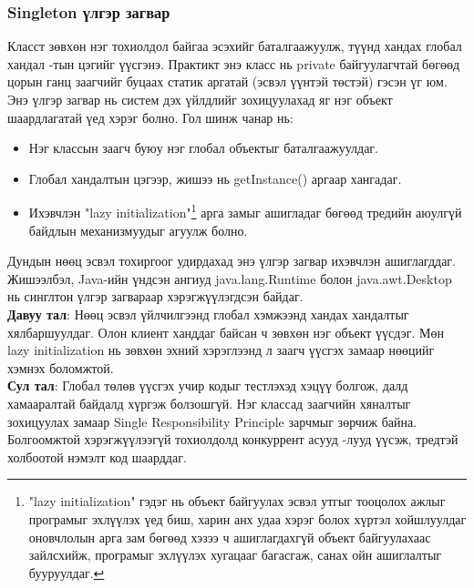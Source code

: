 \subsubsection{Singleton үлгэр загвар}
\quad \quad Класст зөвхөн нэг тохиолдол байгаа эсэхийг баталгаажуулж, түүнд хандах глобал хандал -тын цэгийг үүсгэнэ.
Практикт энэ класс нь private байгуулагчтай бөгөөд цорын ганц заагчийг буцаах статик аргатай (эсвэл үүнтэй төстэй) гэсэн үг юм. Энэ үлгэр загвар нь систем дэх үйлдлийг зохицуулахад яг нэг объект шаардлагатай үед хэрэг болно. Гол шинж чанар нь:
\begin{itemize}
	\item Нэг классын заагч буюу нэг глобал объектыг баталгаажуулдаг.
	\item Глобал хандалтын цэгээр, жишээ нь getInstance() аргаар хангадаг.
	\item Ихэвчлэн "lazy initialization"\footnote{"lazy initialization" гэдэг нь объект байгуулах эсвэл утгыг тооцолох ажлыг програмыг эхлүүлэх үед биш, харин анх удаа хэрэг болох хүртэл хойшлуулдаг оновчлолын арга зам бөгөөд хэзээ ч ашиглагдахгүй объект байгуулахаас зайлсхийж, програмыг эхлүүлэх хугацааг багасгаж, санах ойн ашиглалтыг бууруулдаг.} арга замыг ашигладаг бөгөөд тредийн аюулгүй байдлын механизмуудыг агуулж болно.
\end{itemize}
Дундын нөөц эсвэл тохиргоог удирдахад энэ үлгэр загвар ихэвчлэн ашиглагддаг. Жишээлбэл, Java-ийн үндсэн ангиуд java.lang.Runtime болон java.awt.Desktop нь синглтон үлгэр загвараар хэрэгжүүлэгдсэн байдаг. \\
\textbf{Давуу тал}: Нөөц эсвэл үйлчилгээнд глобал хэмжээнд хандах хандалтыг хялбаршуулдаг. Олон клиент ханддаг байсан ч зөвхөн нэг объект үүсдэг. Мөн lazy initialization нь зөвхөн эхний хэрэглээнд л заагч үүсгэх замаар нөөцийг хэмнэх боломжтой. \\
\textbf{Сул тал}: Глобал төлөв үүсгэх учир кодыг тестлэхэд хэцүү болгож, далд хамааралтай байдалд хүргэж болзошгүй. Нэг классад заагчийн хяналтыг зохицуулах замаар Single Responsibility Principle зарчмыг зөрчиж байна. Болгоомжтой хэрэгжүүлээгүй тохиолдолд конкуррент асууд -лууд үүсэж, тредтэй холбоотой нэмэлт код шаарддаг.

